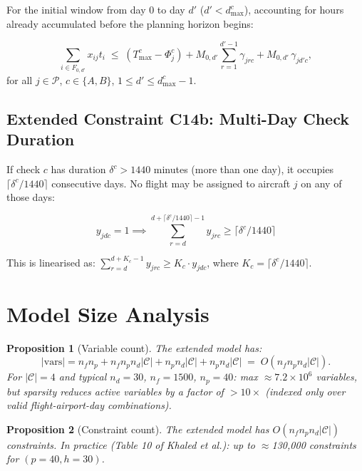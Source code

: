 \documentclass[11pt, a4paper]{article}
\theoremstyle{plain}
\newtheorem{proposition}{Proposition}
\theoremstyle{definition}
\theoremstyle{remark}
\newcommand{\P}{\mathcal{P}}        %
\newcommand{\C}{\mathcal{C}}        %
\begin{document}
For the initial window from day 0 to day $d'$ ($d' < d^c_{\max}$), accounting
for hours already accumulated before the planning horizon begins:

\begin{equation}
  \sum_{i \in F_{0,d'}} x_{ij} t_i
  \;\leq\;
  (T^c_{\max} - \Phi^c_j)
  + M_{0,d'} \sum_{r=1}^{d'-1} \gamma_{jrc}
  + M_{0,d'}\, \gamma_{jd'c},
  \label{eq:c13b}
\end{equation}
for all $j \in \P$, $c \in \{A,B\}$, $1 \leq d' \leq d^c_{\max}-1$.

\subsection{Extended Constraint C14b: Multi-Day Check Duration}

If check $c$ has duration $\delta^c > 1440$ minutes (more than one day), it
occupies $\lceil \delta^c / 1440 \rceil$ consecutive days. No flight may be
assigned to aircraft $j$ on any of those days:

\begin{equation}
  y_{jdc} = 1 \implies
  \sum_{r=d}^{d + \lceil \delta^c/1440 \rceil - 1} y_{jr c} \geq
  \lceil \delta^c/1440 \rceil
  \label{eq:c14b}
\end{equation}

This is linearised as:
$\sum_{r=d}^{d + K_c - 1} y_{jrc} \geq K_c \cdot y_{jdc}$,
where $K_c = \lceil \delta^c / 1440 \rceil$.

\section{Model Size Analysis}

\begin{proposition}[Variable count]
The extended model has:
\[
  |\text{vars}| = n_f n_p + n_f n_p n_d |\C| + n_p n_d |\C| + n_p n_d |\C|
  \;=\; O(n_f n_p n_d |\C|).
\]
For $|\C|=4$ and typical $n_d = 30$, $n_f=1500$, $n_p=40$:
max $\approx 7.2 \times 10^6$ variables, but sparsity reduces active variables
by a factor of $>10\times$ (indexed only over valid flight-airport-day combinations).
\end{proposition}

\begin{proposition}[Constraint count]
The extended model has $O(n_f n_p n_d |\C|)$ constraints.
In practice (Table 10 of Khaled et al.): up to $\approx$130,000 constraints
for $(p=40, h=30)$.
\end{proposition}
\end{document}
